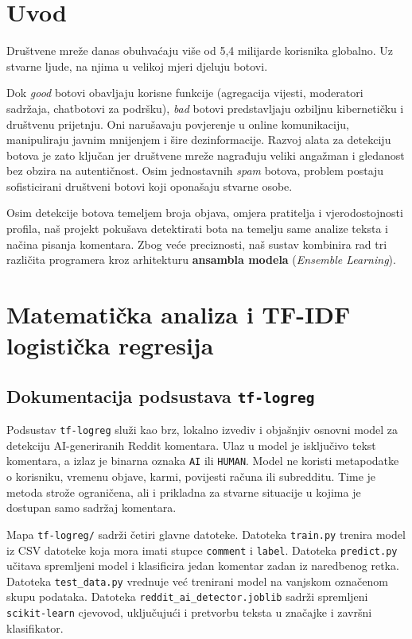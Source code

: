 \documentclass{article}
\begin{document}
\section{Uvod}

Društvene mreže danas obuhvaćaju više od 5,4 milijarde korisnika globalno. Uz stvarne ljude, na njima u velikoj mjeri djeluju botovi. 

Dok \textit{good} botovi obavljaju korisne funkcije (agregacija vijesti, moderatori sadržaja, chatbotovi za podršku), \textit{bad} botovi predstavljaju ozbiljnu kibernetičku i društvenu prijetnju. Oni narušavaju povjerenje u online komunikaciju, manipuliraju javnim mnijenjem i šire dezinformacije. Razvoj alata za detekciju botova je zato ključan jer društvene mreže nagrađuju veliki angažman i gledanost bez obzira na autentičnost. Osim jednostavnih \textit{spam} botova, problem postaju sofisticirani društveni botovi koji oponašaju stvarne osobe.

Osim detekcije botova temeljem broja objava, omjera pratitelja i vjerodostojnosti profila, naš projekt pokušava detektirati bota na temelju same analize teksta i načina pisanja komentara. Zbog veće preciznosti, naš sustav kombinira rad tri različita programera kroz arhitekturu \textbf{ansambla modela} (\textit{Ensemble Learning}).


\section{Matematička analiza i TF-IDF logistička regresija}

\subsection{Dokumentacija podsustava \texttt{tf-logreg}}

Podsustav \texttt{tf-logreg} služi kao brz, lokalno izvediv i objašnjiv osnovni model za detekciju AI-generiranih Reddit komentara. Ulaz u model je isključivo tekst komentara, a izlaz je binarna oznaka \texttt{AI} ili \texttt{HUMAN}. Model ne koristi metapodatke o korisniku, vremenu objave, karmi, povijesti računa ili subredditu. Time je metoda strože ograničena, ali i prikladna za stvarne situacije u kojima je dostupan samo sadržaj komentara.

Mapa \texttt{tf-logreg/} sadrži četiri glavne datoteke. Datoteka \texttt{train.py} trenira model iz CSV datoteke koja mora imati stupce \texttt{comment} i \texttt{label}. Datoteka \texttt{predict.py} učitava spremljeni model i klasificira jedan komentar zadan iz naredbenog retka. Datoteka \texttt{test\_data.py} vrednuje već trenirani model na vanjskom označenom skupu podataka. Datoteka \texttt{reddit\_ai\_detector.joblib} sadrži spremljeni \texttt{scikit-learn} cjevovod, uključujući i pretvorbu teksta u značajke i završni klasifikator.
\end{document}
